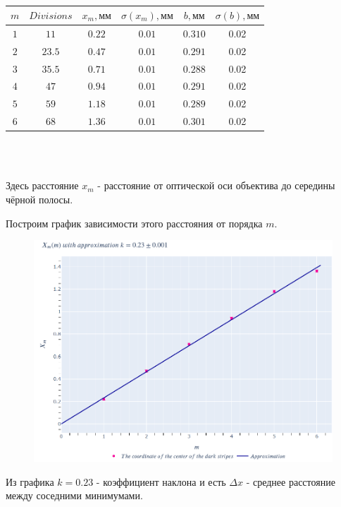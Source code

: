 \documentclass[a4paper,12pt]{article} %
\begin{document}
\begin{table}[H]
\begin{center}
\begin{tabular}{|c|c|c|c|c|c|}\hline
$m$ & $Divisions$ & $x_m, \text{мм}$ & $\sigma(x_m), \text{мм}$ & $b, \text{мм}$ & $\sigma(b), \text{мм}$\\\hline
$1$ & $11$  & $0.22$ & $0.01$ & $ 0.310$ & 0.02\\\hline
$2$ & $23.5$ & $0.47$ & $0.01$ & $0.291$ & 0.02\\\hline
$3$ & $35.5$ & $0.71$ & $0.01$ & $0.288$ & 0.02\\\hline
$4$ & $47$ & $0.94$ & $0.01$ & $0.291$ & 0.02\\\hline
$5$ & $59$ & $1.18$ & $0.01$ & $0.289$ & 0.02\\\hline
$6$ & $68$ & $1.36$ & $0.01$ & $0.301$ & 0.02\\\hline
\end{tabular}\\~\\
\end{center}
\caption{\label{tab:second}}
\end{table}

Здесь расстояние $x_m$ - расстояние от оптической оси объектива до середины чёрной полосы.

Построим график зависимости этого расстояния от порядка $m$.

\begin{figure}[H]
\includegraphics[scale=0.9]{Fraunhofer.png}
\end{figure}

Из графика  $k = 0.23$ - коэффициент наклона и есть $\Delta x$ - среднее расстояние между соседними минимумами.
\end{document}
